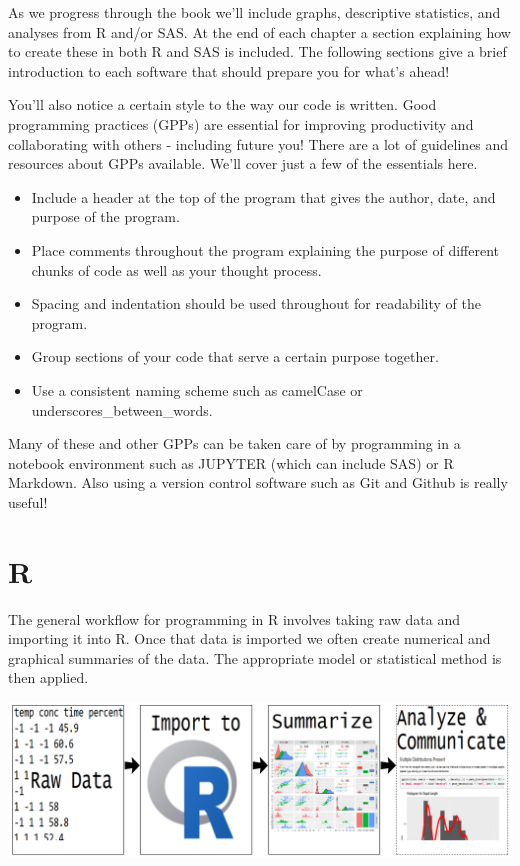 \documentclass[
]{book}
\theoremstyle{definition}
\theoremstyle{definition}
\theoremstyle{definition}
\theoremstyle{remark}
\begin{document}
As we progress through the book we'll include graphs, descriptive statistics, and analyses from R and/or SAS. At the end of each chapter a section explaining how to create these in both R and SAS is included. The following sections give a brief introduction to each software that should prepare you for what's ahead!

You'll also notice a certain style to the way our code is written. Good programming practices (GPPs) are essential for improving productivity and collaborating with others - including future you! There are a lot of guidelines and resources about GPPs available. We'll cover just a few of the essentials here.

\begin{itemize}
\item
  Include a header at the top of the program that gives the author, date, and purpose of the program.
\item
  Place comments throughout the program explaining the purpose of different chunks of code as well as your thought process.
\item
  Spacing and indentation should be used throughout for readability of the program.
\item
  Group sections of your code that serve a certain purpose together.
\item
  Use a consistent naming scheme such as camelCase or underscores\_between\_words.
\end{itemize}

Many of these and other GPPs can be taken care of by programming in a notebook environment such as JUPYTER (which can include SAS) or R Markdown. Also using a version control software such as Git and Github is really useful!

\hypertarget{r}{%
\section{R}\label{r}}

The general workflow for programming in R involves taking raw data and importing it into R. Once that data is imported we often create numerical and graphical summaries of the data. The appropriate model or statistical method is then applied.

\begin{center}\includegraphics[width=0.8\linewidth]{img/RWorkFlow} \end{center}
\end{document}
